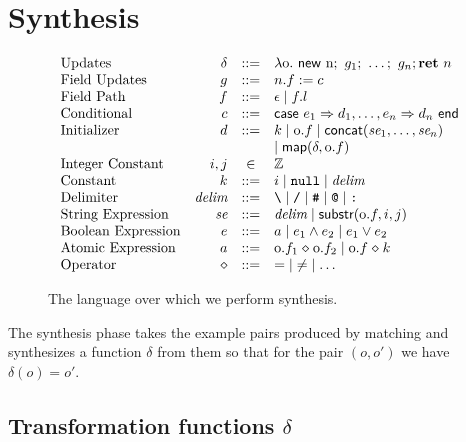 \documentclass[natbib]{sigplanconf}
\begin{document}
\section{Synthesis}
\label{sec:synthesis}

\begin{figure}
\small
\[
\begin{array}{lrcl}
\text{Updates} & \delta & \mathrel{::=} & \lambda \textrm{o}.\ \mathsf{new}\ \textrm{n};\
g_1;\ \ldots;\ g_n; \textbf{ret}\ n\\
\text{Field Updates} & g & \mathrel{::=} & n.f := c \\
\text{Field Path} & f & \mathrel{::=} & \epsilon \mid f.l \\
\text{Conditional} & c & \mathrel{::=} & \textsf{case } e_1 \Rightarrow d_1, \ldots, e_n \Rightarrow d_n \textsf{ end} \\
\text{Initializer} & d & \mathrel{::=} & k \mid \textrm{o}.f \mid \textsf{concat}(\textit{se}_1,\ldots,\textit{se}_n) \\
& & & \mid \textsf{map}(\delta, \textrm{o}.f) \\
\text{Integer Constant} & i, j & \in & \mathbb{Z} \\
\text{Constant} & k & \mathrel{::=} & i \mid \texttt{null} \mid \textit{delim} \\
\text{Delimiter} & \textit{delim} & \mathrel{::=} & \texttt{\textbackslash} \mid \texttt{/} \mid \texttt{\#} \mid \texttt{@} \mid \texttt{:} \\
\text{String Expression} & \textit{se} & \mathrel{::=} & \textit{delim} \mid \textsf{substr}(\textrm{o}.f,i,j)\\
\text{Boolean Expression} & e & \mathrel{::=} & a \mid e_1 \wedge e_2 \mid e_1 \vee e_2 \\
\text{Atomic Expression} & a & \mathrel{::=} & \textrm{o}.f_1 \mathrel{\diamond} \textrm{o}.f_2 \mid \textrm{o}.f \mathrel{\diamond} k \\
\text{Operator} & \mathrel{\diamond} & \mathrel{::=} & \mathord{=} \mid \mathord{\neq} \mid \ldots
\end{array}
\]
\caption{\label{fig:language}The language over which we perform synthesis.}
\end{figure}

The synthesis phase takes the example pairs produced by matching and
synthesizes a function $\delta$ from them so that for the pair
$(o,o')$ we have $\delta(o) = o'$.

\subsection{Transformation functions $\delta$}
\end{document}
